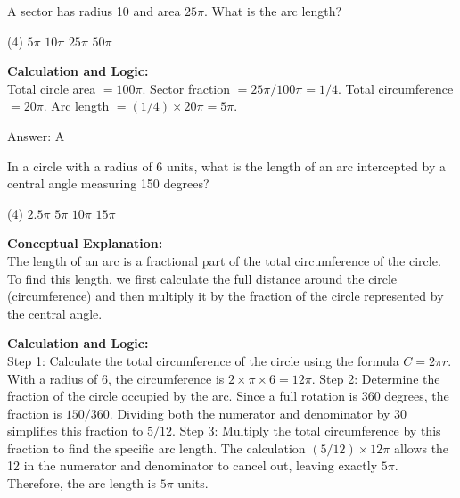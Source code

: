 \documentclass[11pt,paper=a4,answers]{exam}
\begin{document}
\begin{questions}
\vspace{60pt}

\question
A sector has radius 10 and area $25\pi$. What is the arc length?
\begin{tasks}(4)
    \task $5\pi$
    \task $10\pi$
    \task $25\pi$
    \task $50\pi$
\end{tasks}

\begin{solution}
\textbf{Calculation and Logic:} \\
Total circle area $= 100\pi$. Sector fraction $= 25\pi / 100\pi = 1/4$. Total circumference $= 20\pi$. Arc length $= (1/4) \times 20\pi = 5\pi$.

\vspace{30pt}

Answer: \colorbox{yellow!100}{A}
\end{solution}

\vspace{60pt}


\question
In a circle with a radius of 6 units, what is the length of an arc intercepted by a central angle measuring 150 degrees?
\begin{tasks}(4)
    \task $2.5\pi$
    \task $5\pi$
    \task $10\pi$
    \task $15\pi$
\end{tasks}

\begin{solution}
\textbf{Conceptual Explanation:} \\
The length of an arc is a fractional part of the total circumference of the circle. To find this length, we first calculate the full distance around the circle (circumference) and then multiply it by the fraction of the circle represented by the central angle.

\vspace{30pt}

\textbf{Calculation and Logic:} \\
Step 1: Calculate the total circumference of the circle using the formula $C = 2\pi r$. With a radius of 6, the circumference is $2 \times \pi \times 6 = 12\pi$. Step 2: Determine the fraction of the circle occupied by the arc. Since a full rotation is 360 degrees, the fraction is $150 / 360$. Dividing both the numerator and denominator by 30 simplifies this fraction to $5 / 12$. Step 3: Multiply the total circumference by this fraction to find the specific arc length. The calculation $(5 / 12) \times 12\pi$ allows the 12 in the numerator and denominator to cancel out, leaving exactly $5\pi$. Therefore, the arc length is $5\pi$ units.


\end{solution}
\end{questions}
\end{document}
